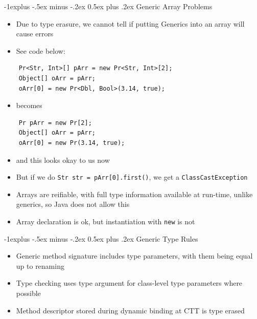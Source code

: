 \documentclass[10pt, landscape]{article}
\makeatletter
\renewcommand{\section}{\@startsection{section}{1}{0mm}%
                                {-1ex plus -.5ex minus -.2ex}%
                                {0.5ex plus .2ex}%
                                {\normalfont\large\bfseries}}
\renewcommand{\section}{\@startsection{section}{2}{0mm}%
                                {-1explus -.5ex minus -.2ex}%
                                {0.5ex plus .2ex}%
                                {\normalfont\normalsize\bfseries}}
\makeatother
\begin{document}
\begin{multicols*}{4}
\section{Generic Array Problems}
\begin{itemize}
    \item Due to type erasure, we cannot tell if putting Generics into an array will cause errors
    \item See code below:
\end{itemize}
\begin{lstlisting}
    Pr<Str, Int>[] pArr = new Pr<Str, Int>[2];
    Object[] oArr = pArr;
    oArr[0] = new Pr<Dbl, Bool>(3.14, true);
\end{lstlisting}
\begin{itemize}
    \item becomes
\end{itemize}
\begin{lstlisting}
    Pr pArr = new Pr[2];
    Object[] oArr = pArr;
    oArr[0] = new Pr(3.14, true);
\end{lstlisting}
\begin{itemize}
    \item and this looks okay to us now
    \item But if we do \verb|Str str = pArr[0].first()|, we get a \lstinline{ClassCastException}
    \item Arrays are reifiable, with full type information available at run-time, unlike generics, so Java does not allow this
    \item Array declaration is ok, but instantiation with \verb|new| is not
\end{itemize}

\section{Generic Type Rules}
\begin{itemize}
    \item Generic method signature includes type parameters, with them being equal up to renaming
    \item Type checking uses type argument for class-level type parameters where possible
    \item Method descriptor stored during dynamic binding at CTT is type erased
\end{itemize}


\end{multicols*}
\end{document}
